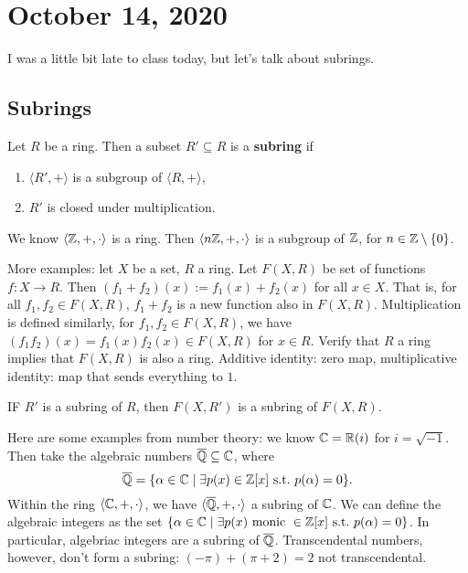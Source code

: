 \section{October 14, 2020}
I was a little bit late to class today, but let's talk about subrings.
\subsection{Subrings}
\begin{definition}[Subring]
    Let $R$ be a ring. Then a subset $R'\subseteq R$ is a \textbf{subring} if 
    \begin{enumerate}
        \item $\langle R',+ \rangle $ is a subgroup of $\langle R,+ \rangle $,
        \item $R'$ is closed under multiplication.
    \end{enumerate}
\end{definition}
\begin{example}
    We know $\langle \mathbb{Z},+,\cdot  \rangle $ is a ring. Then $\langle n\mathbb{Z},+,\cdot  \rangle $ is a subgroup of $\mathbb{Z}$, for $n\in \mathbb{Z}\setminus \{0\} $. 

    More examples: let $X$ be a set, $R$ a ring. Let $F(X,R)$ be set of functions $f \colon X \to R$. Then $(f_1+f_2)(x):=f_1(x)+f_2(x)$ for all $x\in X$. That is, for all $f_1,f_2\in F(X,R)$, $f_1+f_2$ is a new function also in $F(X,R)$. Multiplication is defined similarly, for $f_1,f_2\in F(X,R)$, we have $(f_1f_2)(x)=f_1(x)f_2(x)\in F(X,R)$ for $x\in R$. Verify that $R$ a ring implies that $F(X,R)$ is also a ring. Additive identity: zero map, multiplicative identity: map that sends everything to $1$.
    \begin{note}
        IF $R'$ is a subring of $R$, then $F(X,R')$ is a subring of $F(X,R)$.
    \end{note}
\end{example}
\begin{example}
    Here are some examples from number theory: we know $\mathbb{C}=\mathbb{R}(i)$ for $i=\sqrt{-1} $. Then take the algebraic numbers $\overline{\mathbb{Q}}\subseteq \mathbb{C}$, where \[
        \overline{\mathbb{Q}}=\{\alpha \in \mathbb{C} \mid \exists p(x) \in \mathbb{Z}[x] \ \text{s.t.} \ p(\alpha )=0\} .
    \] Within the ring $\langle \mathbb{C},+,\cdot  \rangle $, we have $\langle \overline{\mathbb{Q}},+,\cdot  \rangle $ a subring of $\mathbb{C}$. We can define the algebraic integers as the set $\{\alpha \in \C \mid \exists p(x) \ \text{monic} \ \in \Z[x] \ \text{s.t.} \ p(\alpha )=0\}$. In particular, algebriac integers are a subring of $\overline{\mathbb{Q}}$. Transcendental numbers, however, don't form a subring: $(-\pi)+(\pi+2)=2$ not transcendental.
\end{example}
